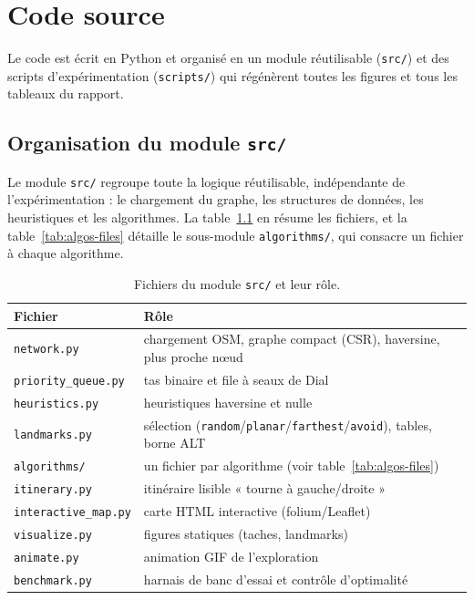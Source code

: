 \chapter{Code source}
\label{appn}

Le code est écrit en Python et organisé en un module réutilisable
(\texttt{src/}) et des scripts d'expérimentation (\texttt{scripts/}) qui
régénèrent toutes les figures et tous les tableaux du rapport.

\section{Organisation du module \texttt{src/}}

Le module \texttt{src/} regroupe toute la logique réutilisable, indépendante de
l'expérimentation : le chargement du graphe, les structures de données, les
heuristiques et les algorithmes. La table~\ref{tab:src} en résume les fichiers, et
la table~\ref{tab:algos-files} détaille le sous-module \texttt{algorithms/}, qui
consacre un fichier à chaque algorithme.

\begin{table}[H]
  \centering
  \small
  \begin{tabular}{@{}ll@{}}
    \toprule
    Fichier & Rôle \\
    \midrule
    \texttt{network.py}        & chargement OSM, graphe compact (CSR), haversine, plus proche nœud \\
    \texttt{priority\_queue.py} & tas binaire et file à seaux de Dial \\
    \texttt{heuristics.py}     & heuristiques haversine et nulle \\
    \texttt{landmarks.py}      & sélection (\texttt{random}/\texttt{planar}/\texttt{farthest}/\texttt{avoid}), tables, borne ALT \\
    \texttt{algorithms/}       & un fichier par algorithme (voir table~\ref{tab:algos-files}) \\
    \texttt{itinerary.py}      & itinéraire lisible « tourne à gauche/droite » \\
    \texttt{interactive\_map.py} & carte HTML interactive (folium/Leaflet) \\
    \texttt{visualize.py}      & figures statiques (taches, landmarks) \\
    \texttt{animate.py}        & animation GIF de l'exploration \\
    \texttt{benchmark.py}      & harnais de banc d'essai et contrôle d'optimalité \\
    \bottomrule
  \end{tabular}
  \caption{Fichiers du module \texttt{src/} et leur rôle.}
  \label{tab:src}
\end{table}

